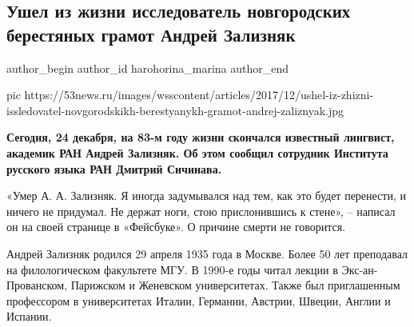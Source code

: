  
 
 
 
 
 
\subsection{Ушел из жизни исследователь новгородских берестяных грамот Андрей Зализняк}
\label{sec:24_12_2017.news.ru.53news.harohorina_marina.1.umer_zaliznjak_andrei_gramoty}
\ifcmt
	author_begin
   author_id harohorina_marina
	author_end
\fi

\ifcmt
pic https://53news.ru/images/wsscontent/articles/2017/12/ushel-iz-zhizni-issledovatel-novgorodskikh-berestyanykh-gramot-andrej-zaliznyak.jpg
\fi

\textbf{Сегодня, 24 декабря, на 83-м году жизни скончался известный лингвист,
академик РАН Андрей Зализняк. Об этом сообщил сотрудник Института русского
языка РАН Дмитрий Сичинава.}


«Умер А. А. Зализняк. Я иногда задумывался над тем, как это будет перенести, и
ничего не придумал. Не держат ноги, стою прислонившись к стене», – написал он
на своей странице в «Фейсбуке». О причине смерти не говорится.

Андрей Зализняк родился 29 апреля 1935 года в Москве. Более 50 лет преподавал
на филологическом факультете МГУ. В 1990-е годы читал лекции в
Экс-ан-Прованском, Парижском и Женевском университетах. Также был приглашенным
профессором в университетах Италии, Германии, Австрии, Швеции, Англии и
Испании.


